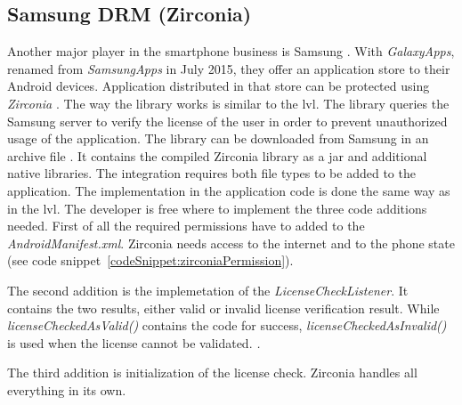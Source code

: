 \subsection{Samsung DRM (Zirconia)} \label{section:license-samsung}
Another major player in the smartphone business is Samsung \cite{comscoreMarket}.
With \textit{GalaxyApps}, renamed from \textit{SamsungApps} in July 2015, they offer an application store to their Android devices.
Application distributed in that store can be protected using \textit{Zirconia} \cite{samsungZirconia}.
\newline
The way the library works is similar to the \gls{lvl}.
The library queries the Samsung server to verify the license of the user in order to prevent unauthorized usage of the application.
The library can be downloaded from Samsung in an archive file  \cite{samsungZirconia}.
It contains the compiled Zirconia library as a \gls{jar} and additional native libraries.
The integration requires both file types to be added to the application.
\newline
The implementation in the application code is done the same way as in the \gls{lvl}.
The developer is free where to implement the three code additions needed.
\newline
First of all the required permissions have to added to the \textit{AndroidManifest.xml}.
Zirconia needs access to the internet and to the phone state (see code snippet~\ref{codeSnippet:zirconiaPermission}).
\newline

The second addition is the implemetation of the \textit{LicenseCheckListener}.
It contains the two results, either valid or invalid license verification result.
While \textit{licenseCheckedAsValid()} contains the code for success, \textit{licenseCheckedAsInvalid()} is used when the license cannot be validated.
\textit.

The third addition is initialization of the license check.
Zirconia handles all everything in its own.
